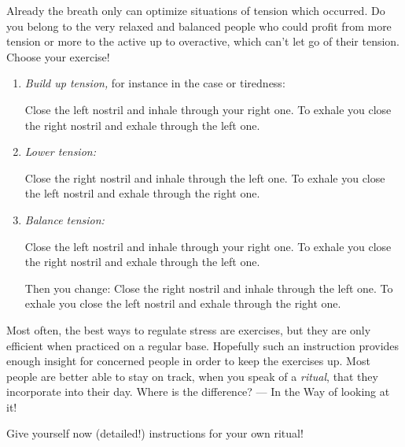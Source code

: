 \documentclass[../main.tex]{subfiles}
\begin{document}
\label{Ex:BreathingEx}
Already the breath only can optimize situations of tension which occurred.
Do you belong to the very relaxed and balanced people who could profit from more tension
or more to the active up to overactive, which can't let go of their tension.
Choose your exercise!

\begin{enumerate}
\item \emph{Build up tension,} for instance in the case or tiredness:

  Close the left nostril and inhale through your right one.
  To exhale you close the right nostril and exhale through the left one.

\item \emph{Lower tension:}

  Close the right nostril and inhale through the left one.
  To exhale you close the left nostril and exhale through the right one.

\item \emph{Balance tension:}

  Close the left nostril and inhale through your right one.
  To exhale you close the right nostril and exhale through the left one.

  Then you change:
   Close the right nostril and inhale through the left one.
  To exhale you close the left nostril and exhale through the right one.

\end{enumerate}

Most often, the best ways to regulate stress are exercises, but they are only efficient when practiced on a regular base.
Hopefully such an instruction provides enough insight for concerned people in order to keep the exercises up.
Most people are better able to stay on track, when you speak of a \emph{ritual}, that they incorporate into their day.
Where is the difference? --- In the Way of looking at it!

Give yourself now (detailed!) instructions for your own ritual!


\end{document}
